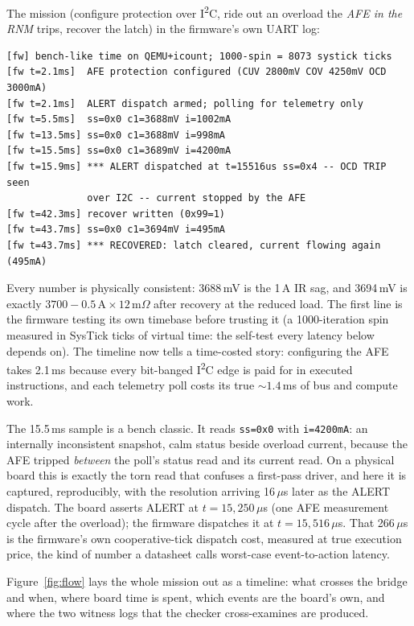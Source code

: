 \documentclass[11pt]{article}
\newcommand{\iic}{I\textsuperscript{2}C}
\begin{document}
The mission (configure protection over \iic{}, ride out an
overload the \emph{AFE in the RNM} trips, recover the latch) in
the firmware's own UART log:

{\small
\begin{verbatim}
[fw] bench-like time on QEMU+icount; 1000-spin = 8073 systick ticks
[fw t=2.1ms]  AFE protection configured (CUV 2800mV COV 4250mV OCD 3000mA)
[fw t=2.1ms]  ALERT dispatch armed; polling for telemetry only
[fw t=5.5ms]  ss=0x0 c1=3688mV i=1002mA
[fw t=13.5ms] ss=0x0 c1=3688mV i=998mA
[fw t=15.5ms] ss=0x0 c1=3689mV i=4200mA
[fw t=15.9ms] *** ALERT dispatched at t=15516us ss=0x4 -- OCD TRIP seen
              over I2C -- current stopped by the AFE
[fw t=42.3ms] recover written (0x99=1)
[fw t=43.7ms] ss=0x0 c1=3694mV i=495mA
[fw t=43.7ms] *** RECOVERED: latch cleared, current flowing again (495mA)
\end{verbatim}
}

Every number is physically consistent: 3688\,mV is the 1\,A IR sag,
and 3694\,mV is exactly $3700 - 0.5\,\mathrm{A} \times
12\,\mathrm{m}\Omega$ after recovery at the reduced load.  The first
line is the firmware testing its own timebase before trusting it
(a 1000-iteration spin measured in SysTick ticks of virtual time:
the self-test every latency below depends on).  The timeline now tells
a time-costed story: configuring the AFE takes 2.1\,ms because every
bit-banged \iic{} edge is paid for in executed instructions, and
each telemetry poll costs its true ${\sim}1.4$\,ms of bus and
compute work.

The 15.5\,ms sample is a bench classic.  It reads \texttt{ss=0x0}
with \texttt{i=4200mA}: an internally inconsistent snapshot, calm
status beside overload current, because the AFE tripped
\emph{between} the poll's status read and its current read.  On a
physical board this is exactly the torn read that confuses a
first-pass driver, and here it is captured, reproducibly, with the
resolution arriving 16\,$\mu$s later as the ALERT dispatch.  The
board asserts ALERT at $t = 15{,}250\,\mu$s (one AFE measurement
cycle after the overload); the firmware dispatches it at
$t = 15{,}516\,\mu$s.  That 266\,$\mu$s is the firmware's own
cooperative-tick dispatch cost, measured at true execution price,
the kind of number a datasheet calls worst-case event-to-action
latency.

Figure~\ref{fig:flow} lays the whole mission out as a timeline:
what crosses the bridge and when, where board time is spent, which
events are the board's own, and where the two witness logs that the
checker cross-examines are produced.
\end{document}
